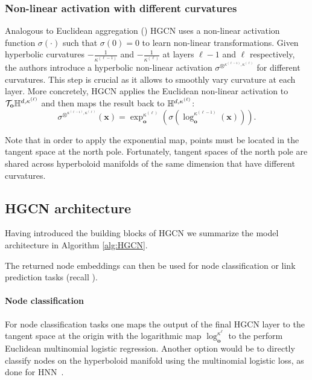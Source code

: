 \subsubsection{Non-linear activation with different curvatures}
Analogous to Euclidean aggregation () HGCN uses a non-linear activation function $\sigma(\cdot)$ such that $\sigma(0)=0$ to learn non-linear transformations. Given hyperbolic curvatures $-\frac{1}{\kappa^{(\ell-1)}}$ and $-\frac{1}{\kappa^{(\ell)}}$ at layers $\ell-1$ and $\ell$ respectively, the authors introduce a hyperbolic non-linear activation $\sigma^{\otimes^{\kappa^{(\ell-1)}, \kappa^{(\ell)}}}$ for different curvatures. This step is crucial as it allows to smoothly vary curvature at each layer. More concretely, HGCN applies the Euclidean non-linear activation to $\mathcal{T}_\mathbf{o}\mathbb{H}^{d,\kappa^{(\ell)}}$ and then maps the result back to $\mathbb{H}^{d,\kappa^{(\ell)}}$:
\begin{equation*}
    \sigma^{\otimes^{\kappa^{(\ell-1)}, \kappa^{(\ell)}}}(\mathbf{x}) = \exp_{\mathbf{o}}^{\kappa^{(\ell)}}\left(\sigma\left(\log_{\mathbf{o}}^{\kappa^{(\ell-1)}}(\mathbf{x})\right)\right).
\end{equation*}

Note that in order to apply the exponential map, points must be located in the tangent space at the north pole. Fortunately, tangent spaces of the north pole are shared across hyperboloid manifolds of the same dimension that have different curvatures.

\subsection{HGCN architecture}\label{sec:hgcnArchitecture}
Having introduced the building blocks of HGCN we summarize the model architecture in Algorithm \ref{alg:HGCN}.


The returned node embeddings can then be used for node classification or link prediction tasks (recall ).

\paragraph{Node classification}
For node classification tasks one maps the output of the final HGCN layer to the tangent space at the origin with the logarithmic map $\log_\mathbf{o}^{\kappa^\ell}$ to the perform Euclidean multinomial logistic regression. Another option would be to directly classify nodes on the hyperboloid manifold using the multinomial logistic loss, as done for HNN~\cite{ganea2018HNN}.

